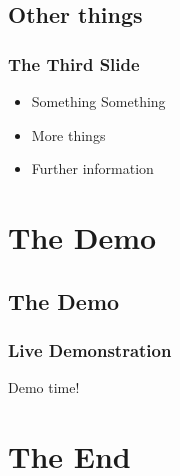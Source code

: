 \documentclass[t,compress,aspectratio=169]{beamer}
\begin{document}
\subsection{Other things}

\begin{frame}
    \frametitle{The Third Slide}
    \begin{itemize}
        \item Something Something
        \item More things
        \item Further information
    \end{itemize}
\end{frame}



\section{The Demo}
\subsection{The Demo}
\begin{frame}
 \frametitle{Live Demonstration}
    \vspace{2.5cm}
    \begin{block}{}
        \centering\begin{Huge}Demo time!\end{Huge}
    \end{block}
\end{frame}


\section{The End}
\end{document}
